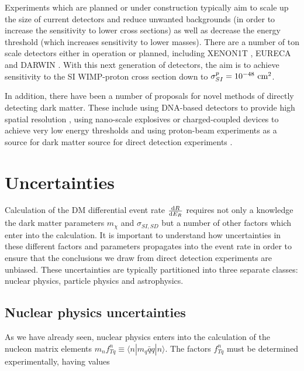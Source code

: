 Experiments which are planned or under construction typically aim to scale up the size of current detectors and reduce unwanted backgrounds (in order to increase the sensitivity to lower cross sections) as well as decrease the energy threshold (which increases sensitivity to lower masses). There are a number of ton scale detectors either in operation or planned, including XENON1T \cite{Aprile:2012}, EURECA \cite{Kraus:2007,Roth:2009} and DARWIN \cite{Baudis:2012}. With this next generation of detectors, the aim is to achieve sensitivity to the SI WIMP-proton cross section down to $\sigma_{SI}^p = 10^{-48} \textrm{ cm}^2$.

In addition, there have been a number of proposals for novel methods of directly detecting dark matter. These include using DNA-based detectors to provide high spatial resolution \cite{Drukier:2012}, using nano-scale explosives \cite{Lopez:2014} or charged-coupled devices \cite{Aguilar-Arevalo:2013} to achieve very low energy thresholds and using proton-beam experiments as a source for dark matter source for direct detection experiments \cite{deNiverville:2012}.



\section{Uncertainties}

Calculation of the DM differential event rate $\frac{\mathrm{d}R}{\mathrm{d}E_R}$ requires not only a knowledge the dark matter parameters $m_\chi$ and $\sigma_{SI,SD}$ but a number of other factors which enter into the calculation. It is important to understand how uncertainties in these different factors and parameters propagates into the event rate in order to ensure that the conclusions we draw from direct detection experiments are unbiased. These uncertainties are typically partitioned into three separate classes: nuclear physics, particle physics and astrophysics.

\subsection{Nuclear physics uncertainties}

As we have already seen, nuclear physics enters into the calculation of the nucleon matrix elements $m_n f_{Tq}^n \equiv \langle n|m_q\bar{q}q|n \rangle$. The factors $f_{Tq}^n$ must be determined experimentally, having values

